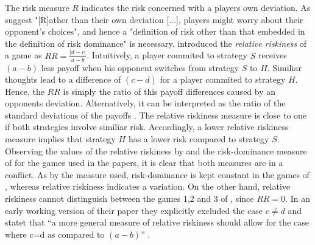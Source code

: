 The risk measure $R$ indicates the risk concerned with a players own
deviation. As \textcite[19]{rydval_loss_2005} suggest "[R]ather than their
own deviation [...], players might worry about their opponent's choices", 
and hence a "definition of risk other than that embedded in the definition
of risk dominance" is necessary.
\textcite[371]{dubois_optimization_2012} 
introduced the \textit{relative riskiness} of a game as
$RR = \frac{|d-c|}{a-b}$.
Intuitively, a player commited to strategy $S$ receives $(a-b)$ less payoff 
when his opponent switches from strategy $S$ to $H$. Similiar thoughts lead
to a difference of $(c-d)$ for a player commited to strategy $H$. Hence, the
$RR$ is simply the ratio of this payoff differences caused by an opponents
deviation.
Alternatively, it can be interpreted as the ratio of the 
standard deviations of the payoffs 
\parencite[372]{dubois_optimization_2012}. 
The relative riskiness measure is close to one if both strategies involve
similiar risk. Accordingly, a lower relative riskiness measure implies that
strategy $H$ has a lower risk compared to strategy $S$.
Observing the values of the relative riskiness by 
\textcite{dubois_optimization_2012} and the risk-dominance measure of 
\textcite{schmidt_playing_2003} for the games used in the papers, it is clear
that both measures are in a conflict. As by the measure 
\textcite{schmidt_playing_2003} used, risk-dominance is kept 
constant in the games of  \textcite{battalio_optimization_2001}, 
whereas relative riskiness indicates a variation. 
On the other hand, relative riskiness cannot distinguish between
the games 1,2 and 3 of \textcite{schmidt_playing_2003}, since $RR=0$. In an
early working version of their paper they explicitly excluded the case 
$c \neq d$ and statet that ``a more general measure of relative riskiness 
should allow for the case where c=d as compared to $(a-b)$'' 
\parencite{dubois_optimization_2008}. 

